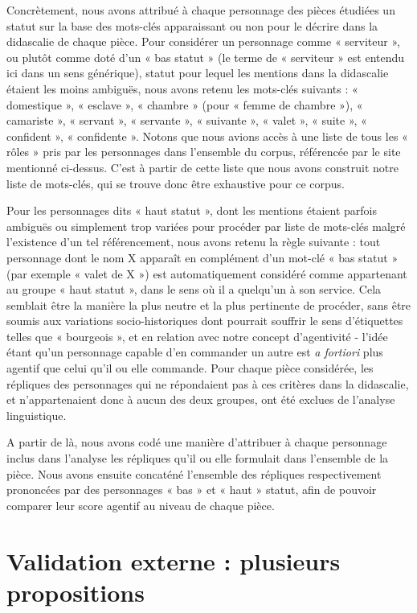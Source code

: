 Concrètement, nous avons attribué à chaque personnage des pièces étudiées un statut sur la base des mots-clés apparaissant ou non pour le décrire dans la didascalie de chaque pièce. Pour considérer un personnage comme « serviteur », ou plutôt comme doté d’un « bas statut » (le terme de « serviteur » est entendu ici dans un sens générique), statut pour lequel les mentions dans la didascalie étaient les moins ambiguës, nous avons retenu les mots-clés suivants : « domestique », « esclave », « chambre » (pour « femme de chambre »), « camariste », « servant », « servante », « suivante », « valet », « suite », « confident », « confidente ». Notons que nous avions accès à une liste de tous les « rôles » pris par les personnages dans l'ensemble du corpus, référencée par le site mentionné ci-dessus. C'est à partir de cette liste que nous avons construit notre liste de mots-clés, qui se trouve donc être exhaustive pour ce corpus.

Pour les personnages dits « haut statut », dont les mentions étaient parfois ambiguës ou simplement trop variées pour procéder par liste de mots-clés malgré l'existence d'un tel référencement, nous avons retenu la règle suivante : tout personnage dont le nom X apparaît en complément d'un mot-clé « bas statut » (par exemple « valet de X ») est automatiquement considéré comme appartenant au groupe « haut statut », dans le sens où il a quelqu'un à son service. Cela semblait être la manière la plus neutre et la plus pertinente de procéder, sans être soumis aux variations socio-historiques dont pourrait souffrir le sens d'étiquettes telles que « bourgeois », et en relation avec notre concept d'agentivité - l'idée étant qu'un personnage capable d'en commander un autre est \textit{a fortiori} plus agentif que celui qu'il ou elle commande. Pour chaque pièce considérée, les répliques des personnages qui ne répondaient pas à ces critères dans la didascalie, et n’appartenaient donc à aucun des deux groupes, ont été exclues de l'analyse linguistique.

A partir de là, nous avons codé une manière d'attribuer à chaque personnage inclus dans l’analyse les répliques qu'il ou elle formulait dans l'ensemble de la pièce. Nous avons ensuite concaténé l’ensemble des répliques respectivement prononcées par des personnages « bas » et « haut » statut, afin de pouvoir comparer leur score agentif au niveau de chaque pièce.

\section{Validation externe : plusieurs propositions}

